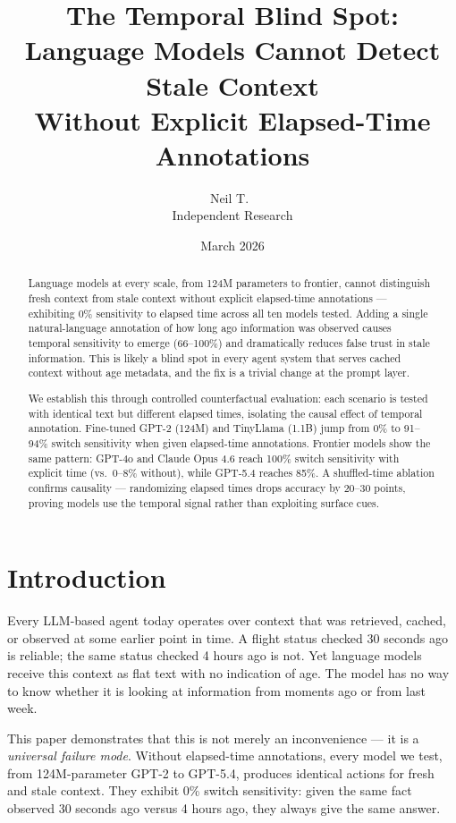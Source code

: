 \documentclass[11pt,a4paper]{article}
\title{The Temporal Blind Spot: Language Models Cannot Detect Stale Context\\Without Explicit Elapsed-Time Annotations}
\author{
  Neil T.\ \\
  Independent Research
}
\date{March 2026}
\begin{document}
\maketitle

\begin{abstract}
Language models at every scale, from 124M parameters to frontier, cannot distinguish fresh context from stale context without explicit elapsed-time annotations --- exhibiting 0\% sensitivity to elapsed time across all ten models tested.
Adding a single natural-language annotation of how long ago information was observed causes temporal sensitivity to emerge (66--100\%) and dramatically reduces false trust in stale information.
This is likely a blind spot in every agent system that serves cached context without age metadata, and the fix is a trivial change at the prompt layer.

We establish this through controlled counterfactual evaluation: each scenario is tested with identical text but different elapsed times, isolating the causal effect of temporal annotation.
Fine-tuned GPT-2 (124M) and TinyLlama (1.1B) jump from 0\% to 91--94\% switch sensitivity when given elapsed-time annotations.
Frontier models show the same pattern: GPT-4o and Claude Opus 4.6 reach 100\% switch sensitivity with explicit time (vs.\ 0--8\% without), while GPT-5.4 reaches 85\%.
A shuffled-time ablation confirms causality --- randomizing elapsed times drops accuracy by 20--30 points, proving models use the temporal signal rather than exploiting surface cues.
\end{abstract}

\section{Introduction}
\label{sec:intro}

Every LLM-based agent today operates over context that was retrieved, cached, or observed at some earlier point in time.
A flight status checked 30 seconds ago is reliable; the same status checked 4 hours ago is not.
Yet language models receive this context as flat text with no indication of age.
The model has no way to know whether it is looking at information from moments ago or from last week.

This paper demonstrates that this is not merely an inconvenience --- it is a \emph{universal failure mode}.
Without elapsed-time annotations, every model we test, from 124M-parameter GPT-2 to GPT-5.4, produces identical actions for fresh and stale context.
They exhibit 0\% switch sensitivity: given the same fact observed 30 seconds ago versus 4 hours ago, they always give the same answer.
\end{document}
